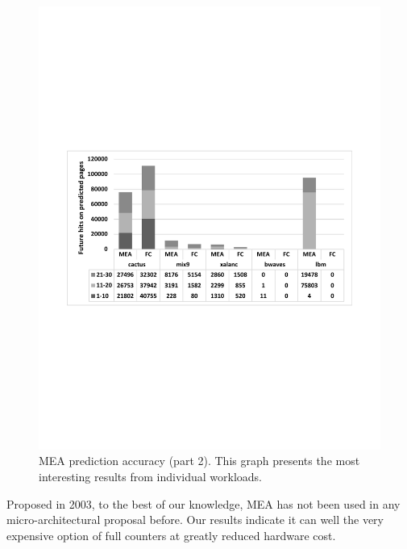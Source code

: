 \begin{figure}[t]
\centering
  \includegraphics[scale=.45]{figures/mea_3_v2.pdf}
  \caption{MEA prediction accuracy (part 2). This graph presents the most interesting results from individual workloads.}
  \label{fig:mea_3}
\end{figure}

Proposed in 2003, to the best of our knowledge, MEA has not been used in any micro-architectural proposal before. Our results indicate it can well the very expensive option of full counters at greatly reduced hardware cost.

